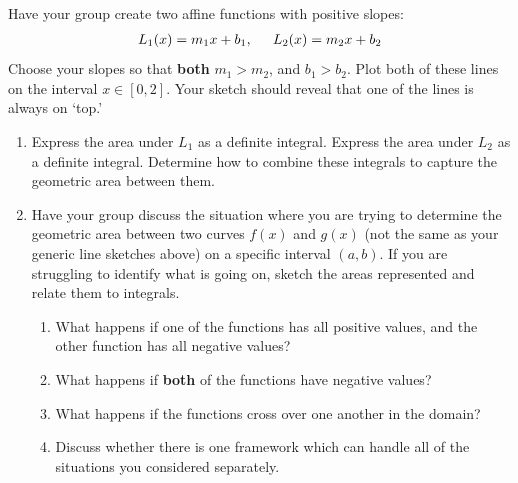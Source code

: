 \documentclass{ximera}
\begin{document}
\begin{exercise}
    Have your group create two affine functions with positive slopes:
    \begin{align}
    	L_{1}(x) = m_{1}x + b_1, \hspace{.2in} L_{2}(x) = m_{2} x + b_2 \nonumber
    \end{align}
    Choose your slopes so that {\bf{both}} $m_{1} >m_2$, and $b_1>b_2$. Plot both of these lines on the interval $x\in [0,2]$. Your sketch should reveal that one of the lines is always on `top.'
    \begin{enumerate}
        \item Express the area under $L_{1}$ as a definite integral. Express the area under $L_2$ as a definite integral. Determine how to combine these integrals to capture the geometric area between them.
        \item Have your group discuss the situation where you are trying to determine the geometric area between two curves $f(x)$ and $g(x)$ (not the same as your generic line sketches above) on a specific interval $(a,b)$. If you are struggling to identify what is going on, sketch the areas represented and relate them to integrals.
        \begin{enumerate}
            \item What happens if one of the functions has all positive values, and the other function has all negative values? 
            \item What happens if {\bf{both}} of the functions have negative values?
            \item What happens if the functions cross over one another in the domain?
            \item Discuss whether there is one framework which can handle all of the situations you considered separately. 
        \end{enumerate}
    \end{enumerate}

\end{exercise}
\end{document}
